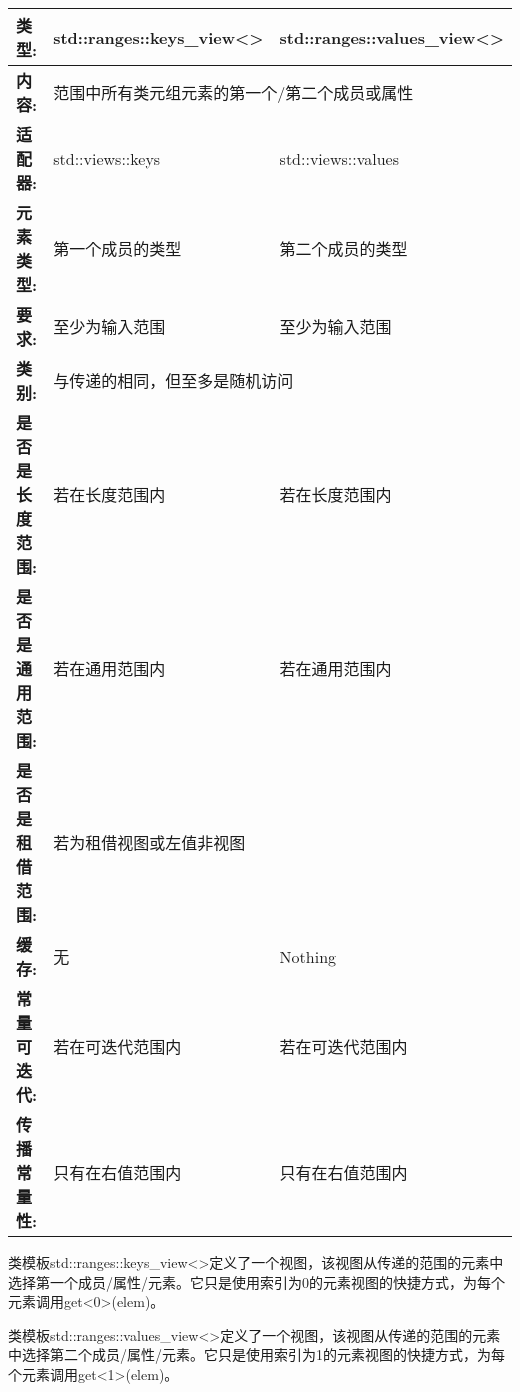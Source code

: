 	

\begin{longtable}[c]{|l|ll|}
\hline
\textbf{类型:}    & \multicolumn{1}{l|}{std::ranges::keys\_view\textless{}\textgreater{}} & std::ranges::values\_view\textless{}\textgreater{} \\ \hline
\endfirsthead
%
\endhead
%
\textbf{内容:} & \multicolumn{2}{l|}{范围中所有类元组元素的第一个/第二个成员或属性}                            \\ \hline
\textbf{适配器:}              & \multicolumn{1}{l|}{std::views::keys}           & std::views::values         \\ \hline
\textbf{元素类型:}         & \multicolumn{1}{l|}{第一个成员的类型}   & 第二个成员的类型  \\ \hline
\textbf{要求:}             & \multicolumn{1}{l|}{至少为输入范围}       & 至少为输入范围       \\ \hline
\textbf{类别:}             & \multicolumn{2}{l|}{与传递的相同，但至多是随机访问}                \\ \hline
\textbf{是否是长度范围:}       & \multicolumn{1}{l|}{若在长度范围内}          & 若在长度范围内          \\ \hline
\textbf{是否是通用范围:}      & \multicolumn{1}{l|}{若在通用范围内}         & 若在通用范围内         \\ \hline
\textbf{是否是租借范围:}    & \multicolumn{2}{l|}{若为租借视图或左值非视图}               \\ \hline
\textbf{缓存:}               & \multicolumn{1}{l|}{无}                    & Nothing                    \\ \hline
\textbf{常量可迭代:}       & \multicolumn{1}{l|}{若在可迭代范围内} & 若在可迭代范围内 \\ \hline
\textbf{传播常量性:} & \multicolumn{1}{l|}{只有在右值范围内}    & 只有在右值范围内    \\ \hline
\end{longtable}

类模板std::ranges::keys\_view<>定义了一个视图，该视图从传递的范围的元素中选择第一个成员/属性/元素。它只是使用索引为0的元素视图的快捷方式，为每个元素调用get<0>(elem)。

类模板std::ranges::values\_view<>定义了一个视图，该视图从传递的范围的元素中选择第二个成员/属性/元素。它只是使用索引为1的元素视图的快捷方式，为每个元素调用get<1>(elem)。

